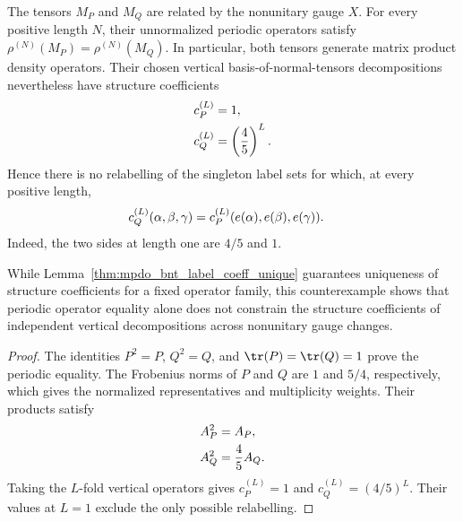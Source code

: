\begin{lemma}%
    \label{thm:mpdo_vertical_coefficients_not_presentation_invariant}
    \leanok
    The tensors $M_P$ and $M_Q$ are related by the nonunitary gauge $X$.
    For every positive length $N$, their unnormalized periodic operators
    satisfy $\rho^{(N)}(M_P)=\rho^{(N)}(M_Q)$.
    In particular, both tensors generate matrix product density operators.
    Their chosen vertical basis-of-normal-tensors decompositions nevertheless have structure
    coefficients
    \begin{align}
        c_P^{(L)} & =1,
        \notag                               \\
        c_Q^{(L)} & =\left(\frac45\right)^L.
        \notag
    \end{align}
    Hence there is no relabelling of the singleton label sets for which,
    at every positive length,
    \begin{align}
        c_Q^{(L)}(\alpha,\beta,\gamma)
         & =c_P^{(L)}(e(\alpha),e(\beta),e(\gamma)).
        \notag
    \end{align}
    Indeed, the two sides at length one are $4/5$ and $1$.

    While Lemma~\ref{thm:mpdo_bnt_label_coeff_unique} guarantees uniqueness of
    structure coefficients for a fixed operator family, this counterexample shows
    that periodic operator equality alone does not constrain the structure coefficients
    of independent vertical decompositions across nonunitary gauge changes.
\end{lemma}
\begin{proof}\leanok
    The identities $P^2=P$, $Q^2=Q$, and
    $\tr(P)=\tr(Q)=1$ prove the periodic equality. The Frobenius norms of
    $P$ and $Q$ are $1$ and $5/4$, respectively, which gives the
    normalized representatives and multiplicity weights. Their products
    satisfy
    \begin{align}
        A_P^2 & =A_P,
        \notag               \\
        A_Q^2 & =\frac45A_Q.
        \notag
    \end{align}
    Taking the $L$-fold vertical operators gives
    $c_P^{(L)}=1$ and $c_Q^{(L)}=(4/5)^L$.
    Their values at $L=1$ exclude the only possible relabelling.
\end{proof}

